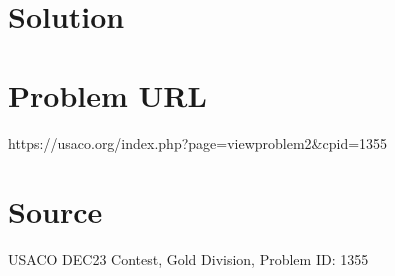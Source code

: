 \documentclass[12pt]{article}
\begin{document}
\section*{Solution}


\section*{Problem URL}
https://usaco.org/index.php?page=viewproblem2&cpid=1355

\section*{Source}
USACO DEC23 Contest, Gold Division, Problem ID: 1355
\end{document}
